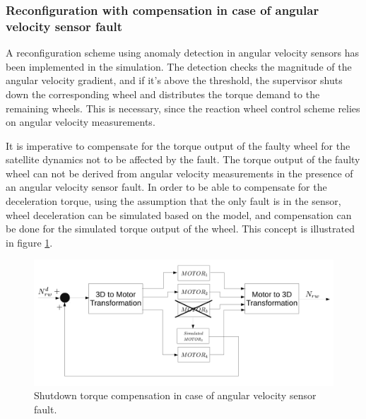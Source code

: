 \subsubsection{Reconfiguration with compensation in case of angular velocity sensor fault}



A reconfiguration scheme using anomaly detection in angular velocity sensors has been implemented in the simulation. The detection checks the magnitude of the angular velocity gradient, and if it's above the threshold, the supervisor shuts down the corresponding wheel and distributes the torque demand to the remaining wheels. This is necessary, since the reaction wheel control scheme relies on angular velocity measurements.

It is imperative to compensate for the torque output of the faulty wheel for the satellite dynamics not to be affected by the fault. The torque output of the faulty wheel can not be derived from angular velocity measurements in the presence of an angular velocity sensor fault. In order to be able to compensate for the deceleration torque, using the assumption that the only fault is in the sensor, wheel deceleration can be simulated based on the model, and compensation can be done for the simulated torque output of the wheel. This concept is illustrated in figure \ref{fig:angFaultCompensation}.


\begin{figure}[H]
	\centering
	\includegraphics[width=120mm]{figures/simulatedCompensation}
	\caption{Shutdown torque compensation in case of angular velocity sensor fault.}
	\label{fig:angFaultCompensation}
\end{figure} 

